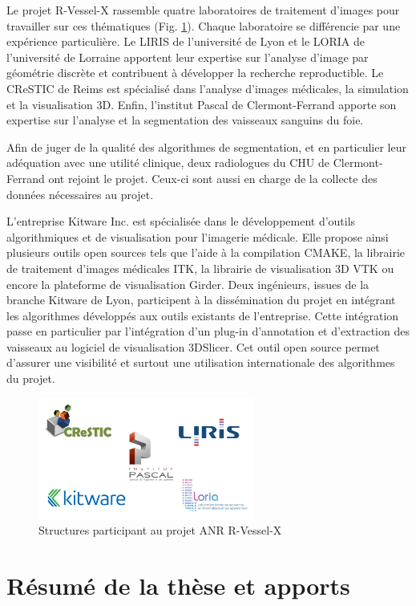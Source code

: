 Le projet R-Vessel-X rassemble quatre laboratoires de traitement d'images pour travailler sur ces thématiques (Fig. \ref{fig:labs}). Chaque laboratoire se différencie par une expérience particulière. Le LIRIS de l'université de Lyon et le LORIA de l'université de Lorraine apportent leur expertise sur l'analyse d'image par géométrie discrète et contribuent à développer la recherche reproductible. Le CReSTIC de Reims est spécialisé dans l'analyse d'images médicales, la simulation et la visualisation 3D. Enfin, l'institut Pascal de Clermont-Ferrand apporte son expertise sur l'analyse et la segmentation des vaisseaux sanguins du foie.

Afin de juger de la qualité des algorithmes de segmentation, et en particulier leur adéquation avec une utilité clinique, deux radiologues du CHU de Clermont-Ferrand ont rejoint le projet. Ceux-ci sont aussi en charge de la collecte des données nécessaires au projet.

L'entreprise Kitware Inc. est spécialisée dans le développement d'outils algorithmiques et de visualisation pour l'imagerie médicale. Elle propose ainsi plusieurs outils open sources tels que l'aide à la compilation CMAKE, la librairie de traitement d'images médicales ITK, la librairie de visualisation 3D VTK ou encore la plateforme de visualisation Girder. Deux ingénieurs, issues de la branche Kitware de Lyon, participent à la dissémination du projet en intégrant les algorithmes développés aux outils existants de l'entreprise. Cette intégration passe en particulier par l'intégration d'un plug-in d'annotation et d'extraction des vaisseaux au logiciel de visualisation 3DSlicer. Cet outil open source permet d'assurer une visibilité et surtout une utilisation internationale des algorithmes du projet.

\begin{figure}[ht]
    \centering
    \includegraphics[height=4cm]{Images/labs.png}
    \caption{Structures participant au projet ANR R-Vessel-X}
    \label{fig:labs}
  \end{figure}

\section{Résumé de la thèse et apports}
\label{sec:introduction:résumé}


